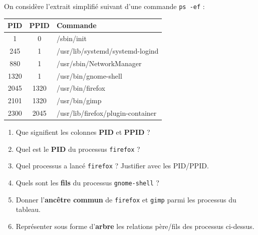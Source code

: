 \documentclass[11pt]{article}
\begin{document}
	
	
	On considère l’extrait simplifié suivant d’une commande \texttt{ps -ef} :
	
	\begin{center}
		\begin{tabular}{|c|c|l|}
			\hline
			\textbf{PID} & \textbf{PPID} & \textbf{Commande} \\ \hline
			1 & 0 & /sbin/init \\ \hline
			245 & 1 & /usr/lib/systemd/systemd-logind \\ \hline
			880 & 1 & /usr/sbin/NetworkManager \\ \hline
			1320 & 1 & /usr/bin/gnome-shell \\ \hline
			2045 & 1320 & /usr/bin/firefox \\ \hline
			2101 & 1320 & /usr/bin/gimp \\ \hline
			2300 & 2045 & /usr/lib/firefox/plugin-container \\ \hline
		\end{tabular}
	\end{center}
	
	\begin{enumerate}
		\item Que signifient les colonnes \textbf{PID} et \textbf{PPID} ?
		\item Quel est le \textbf{PID} du processus \texttt{firefox} ?
		\item Quel processus a lancé \texttt{firefox} ? Justifier avec les PID/PPID.
		\item Quels sont les \textbf{fils} du processus \texttt{gnome-shell} ?
		\item Donner l’\textbf{ancêtre commun} de \texttt{firefox} et \texttt{gimp} parmi les processus du tableau.
		\item Représenter sous forme d’\textbf{arbre} les relations père/fils des processus ci-dessus.
	\end{enumerate}
	
\end{document}
